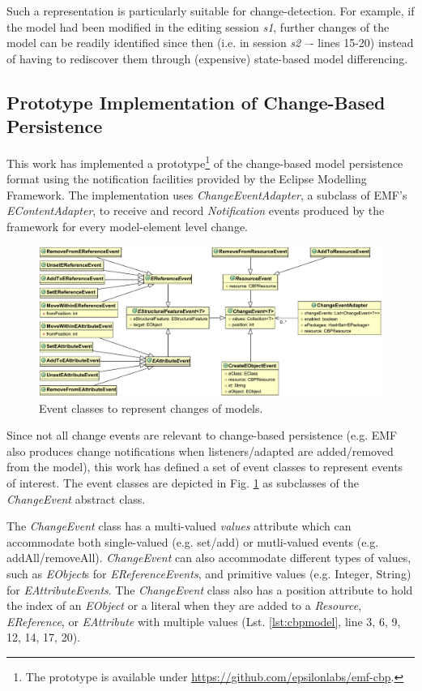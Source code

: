 \documentclass[12pt, a4paper]{report} \usepackage[titletoc]{appendix}
\begin{document}
Such a representation is particularly suitable for change-detection. For example, if the model had been modified in the editing session \emph{s1}, further changes of the model can be readily identified since then (i.e. in session \emph{s2} –- lines 15-20) instead of having to rediscover them through (expensive) state-based model differencing.

\subsection{Prototype Implementation of Change-Based Persistence}
\label{subsec:prototype_implementation_of_change-based_persistence}
This work has implemented a prototype\footnote{The prototype is available under \url{https://github.com/epsilonlabs/emf-cbp}.} of the change-based model persistence format using the notification facilities provided by the Eclipse Modelling Framework. The implementation uses \emph{ChangeEventAdapter}, a subclass of EMF's \emph{EContentAdapter}, to receive and record \emph{Notification} events produced by the framework for every model-element level change.

\begin{figure}[th]
	\centering
	\includegraphics[width=\linewidth]{events}
	\caption{Event classes to represent changes of models.}
	\label{fig:events}
\end{figure}

Since not all change events are relevant to change-based persistence (e.g. EMF also produces change notifications when listeners/adapted are added/removed from the model), this work has defined a set of event classes to represent events of interest. The event classes are depicted in Fig. \ref{fig:events} as subclasses of the \emph{ChangeEvent} abstract class. 

The \emph{ChangeEvent} class has a multi-valued \emph{values} attribute which can accommodate both single-valued (e.g. set/add) or mutli-valued events (e.g. addAll/removeAll). \emph{ChangeEvent} can also accommodate different types of values, such as \emph{EObject}s for \emph{EReferenceEvents}, and primitive values (e.g. Integer, String) for \emph{EAttributeEvents}. The \emph{ChangeEvent} class also has a position attribute to hold the index of an \emph{EObject} or a literal when they are added to a \emph{Resource}, \emph{EReference}, or \emph{EAttribute} with multiple values (Lst. \ref{lst:cbpmodel}, line 3, 6, 9, 12, 14, 17, 20). 
\end{document}

